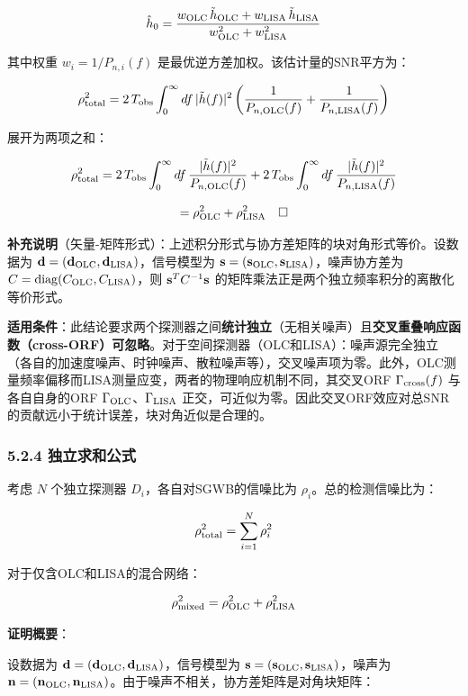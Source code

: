 \documentclass[12pt,a4paper]{article}
\begin{document}
$$\hat{h}_0 = \frac{w_{\rm OLC}\, \tilde{h}_{\rm OLC} + w_{\rm LISA}\, \tilde{h}_{\rm LISA}}{w_{\rm OLC}^2 + w_{\rm LISA}^2}$$

其中权重 $w_i = 1/P_{n,i}(f)$ 是最优逆方差加权。该估计量的SNR平方为：

$$\rho_{\rm total}^2 = 2\, T_{\rm obs} \int_0^\infty df\, |\tilde{h}(f)|^2 \left( \frac{1}{P_{n,\rm OLC}(f)} + \frac{1}{P_{n,\rm LISA}(f)} \right)$$

展开为两项之和：

$$\rho_{\rm total}^2 = 2\, T_{\rm obs} \int_0^\infty df\, \frac{|\tilde{h}(f)|^2}{P_{n,\rm OLC}(f)} + 2\, T_{\rm obs} \int_0^\infty df\, \frac{|\tilde{h}(f)|^2}{P_{n,\rm LISA}(f)}$$

$$= \rho_{\rm OLC}^2 + \rho_{\rm LISA}^2 \quad \square$$

\textbf{补充说明}（矢量-矩阵形式）：上述积分形式与协方差矩阵的块对角形式等价。设数据为 ${\bf d} = ({\bf d}_{\rm OLC}, {\bf d}_{\rm LISA})$，信号模型为 ${\bf s} = ({\bf s}_{\rm OLC}, {\bf s}_{\rm LISA})$，噪声协方差为 $C = {\rm diag}(C_{\rm OLC}, C_{\rm LISA})$，则 ${\bf s}^T C^{-1} {\bf s}$ 的矩阵乘法正是两个独立频率积分的离散化等价形式。

\textbf{适用条件}：此结论要求两个探测器之间\textbf{统计独立}（无相关噪声）且\textbf{交叉重叠响应函数（cross-ORF）可忽略}。对于空间探测器（OLC和LISA）：噪声源完全独立（各自的加速度噪声、时钟噪声、散粒噪声等），交叉噪声项为零。此外，OLC测量频率偏移而LISA测量应变，两者的物理响应机制不同，其交叉ORF $\Gamma_{\rm cross}(f)$ 与各自自身的ORF $\Gamma_{\rm OLC}$、$\Gamma_{\rm LISA}$ 正交，可近似为零。因此交叉ORF效应对总SNR的贡献远小于统计误差，块对角近似是合理的。

\subsubsection{5.2.4 独立求和公式}


考虑 $N$ 个独立探测器 $D_i$，各自对SGWB的信噪比为 $\rho_i$。总的检测信噪比为：

$$\rho_{\rm total}^2 = \sum_{i=1}^N \rho_i^2$$

对于仅含OLC和LISA的混合网络：

$$\rho_{\rm mixed}^2 = \rho_{\rm OLC}^2 + \rho_{\rm LISA}^2$$

\textbf{证明概要}：

设数据为 ${\bf d} = ({\bf d}_{\rm OLC}, {\bf d}_{\rm LISA})$，信号模型为 ${\bf s} = ({\bf s}_{\rm OLC}, {\bf s}_{\rm LISA})$，噪声为 ${\bf n} = ({\bf n}_{\rm OLC}, {\bf n}_{\rm LISA})$。由于噪声不相关，协方差矩阵是对角块矩阵：
\end{document}

